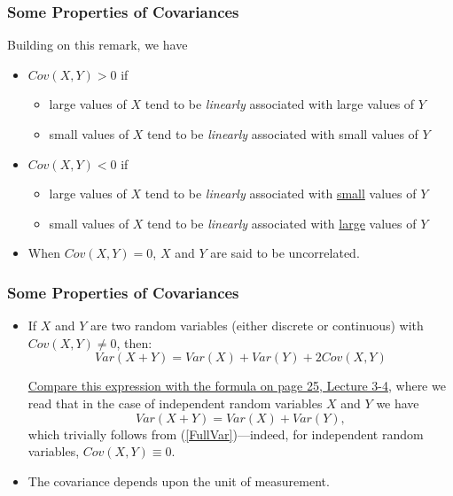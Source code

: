 \documentclass[notes=show,handout]{beamer}\usepackage[]{graphicx}\usepackage[]{color}
\newenvironment{stepitemize}{\begin{itemize}[<+->]}{\end{itemize} }
\begin{document}
\begin{frame}%

\frametitle{Some Properties of Covariances}

Building on this remark, we have

\begin{stepitemize}

\item
\color{black}%
$Cov(X,Y)>0$ if
\begin{stepitemize}
\item large values of $X$ tend to be \emph{linearly }associated with large
values of $Y$
\item small values of $X$ tend to be \emph{linearly }associated with small
values of $Y$\bigskip
\end{stepitemize}
\item $Cov(X,Y)<0$ if
\begin{stepitemize}
\item large values of $X$ tend to be \emph{linearly }associated with
\underline{small} values of $Y$
\item small values of $X$ tend to be \emph{linearly }associated with
\underline{large} values of $Y$\bigskip
\end{stepitemize}
\item When $Cov(X,Y)=0$, $X$ and $Y$ are said to be uncorrelated.
\end{stepitemize}
%
\end{frame}
%
\begin{frame}%
%
\frametitle{Some Properties of Covariances}
%
\begin{stepitemize}
\item  If $X$ and $Y$ are two random variables (either discrete or continuous) with $Cov(X,Y) \neq 0$, then:
\begin{equation}
Var(X + Y) =  Var(X) + Var(Y) + 2 Cov(X,Y) \label{FullVar}
\end{equation}

\underline{Compare this expression with the formula on page 25, Lecture 3-4}, where we read that in the case of independent random variables $X$ and $Y$
we have
$$
Var(X + Y) =  Var(X) + Var(Y),
$$
which trivially follows from (\ref{FullVar})---indeed, for independent random variables, $Cov(X,Y)\equiv 0$.

\item The covariance depends upon the unit of measurement.


\end{stepitemize}
%
\end{frame}
\end{document}
